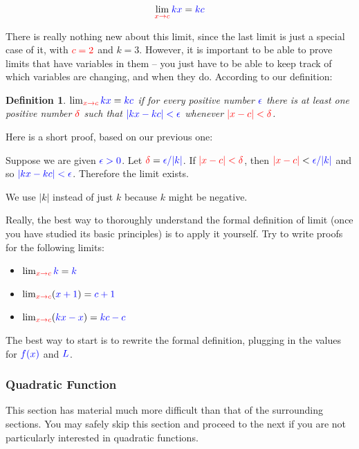 \documentclass{myarticle}
\newcommand\danger{{\fontencoding{U}\fontfamily{futs}\selectfont\char 66\relax}} %
\newcommand{\hor}[1]{\textcolor{red}{#1}} %
\newcommand{\ver}[1]{\textcolor{blue}{#1}}
\theoremstyle{nospace}
\newtheorem*{oldattempt}{Definition}
\newenvironment{attempt}{\begin{mdframed}\begin{oldattempt}}{\end{oldattempt}\end{mdframed}}
\newtheorem{old series theorem}{Theorem}
\newenvironment{series theorem}{\begin{mdframed}\begin{old series theorem}}{\end{old series theorem}\end{mdframed}}
\begin{document}
\[ \lim_{\hor{x \to c}} \ver{kx} = \ver{kc} \]

There is really nothing new about this limit, since the last limit is just a special case of it, with $\hor{c = 2}$ and $k = 3$. However, it is important to be able to prove limits that have variables in them -- you just have to be able to keep track of which variables are changing, and when they do. According to our definition:

\begin{attempt} $\lim_{\hor{x \to c}} \ver{kx} = \ver{kc}$ if for every positive number $\ver{\epsilon}$ there is at least one positive number $\hor{\delta}$ such that $\ver{|kx - kc| < \epsilon}$ whenever $\hor{|x - c| < \delta}$. \end{attempt}

Here is a short proof, based on our previous one:

\begin{mdframed} Suppose we are given $\ver{\epsilon > 0}$. Let $\hor{\delta} = \ver{\epsilon/|k|}$. If $\hor{|x - c| < \delta}$, then $\hor{|x - c|} < \ver{\epsilon/|k|}$ and so $\ver{|kx - kc| < \epsilon}$. Therefore the limit exists. \end{mdframed}

We use $|k|$ instead of just $k$ because $k$ might be negative.

Really, the best way to thoroughly understand the formal definition of limit (once you have studied its basic principles) is to apply it yourself. Try to write proofs for the following limits:

\begin{itemize}
\item $\lim_{\hor{x \to c}} \ver{k} = \ver{k}$
\item $\lim_{\hor{x \to c}} (\ver{x + 1}) = \ver{c + 1}$
\item $\lim_{\hor{x \to c}} (\ver{kx - x}) = \ver{kc - c}$
\end{itemize}

The best way to start is to rewrite the formal definition, plugging in the values for $\ver{f(x)}$ and $\ver{L}$.

\subsubsection{Quadratic Function} \label{sec:quadratic function}

\begin{mdframed} \centering \danger

This section has material much more difficult than that of the surrounding sections. You may safely skip this section and proceed to the next if you are not particularly interested in quadratic functions. \end{mdframed}
\end{document}
